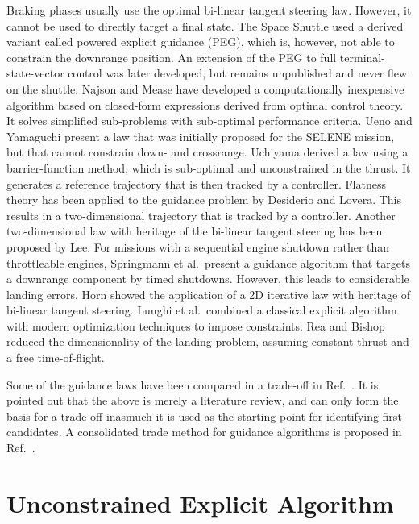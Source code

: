 \documentclass[%
]{aiaa-tc}
\begin{document}
Braking phases usually use the optimal bi-linear tangent steering
law.\cite{Lawden1963} However, it cannot be used to directly target a final
state. The Space Shuttle used a derived variant called powered explicit guidance
(PEG), which is, however, not able to constrain the downrange
position.\cite{McHenry1979} An extension of the PEG to full
terminal-state-vector control was later developed, but remains unpublished and
never flew on the shuttle.\cite{Rea2009,Fill1989} Najson and Mease have developed
a computationally inexpensive algorithm based on closed-form expressions derived
from optimal control theory. It solves simplified sub-problems with sub-optimal
performance criteria.\cite{Najson2006} Ueno and Yamaguchi present a law that was
initially proposed for the SELENE mission, but that cannot constrain down- and
crossrange.\cite{Ueno1999} Uchiyama derived a law using a barrier-function
method, which is sub-optimal and unconstrained in the thrust. It generates a
reference trajectory that is then tracked by a controller.\cite{Uchiyama2007}
Flatness theory has been applied to the guidance problem by Desiderio and
Lovera. This results in a two-dimensional trajectory that is tracked by a
controller.\cite{Desiderio2012} Another two-dimensional law with heritage of the
bi-linear tangent steering has been proposed by Lee.\cite{Lee2011} For missions
with a sequential engine shutdown rather than throttleable engines, Springmann
et al.\ present a guidance algorithm that targets a downrange component by timed
shutdowns. However, this leads to considerable landing
errors.\cite{Springmann2006} Horn showed the application of a 2D iterative law
with heritage of bi-linear tangent steering.\cite{Horn1965,Horn1965a} Lunghi et
al.\ combined a classical explicit algorithm with modern optimization techniques
to impose constraints.\cite{Lunghi2013} Rea and Bishop reduced the
dimensionality of the landing problem, assuming constant thrust and a free
time-of-flight.\cite{Rea2010}

Some of the guidance laws have been compared in a trade-off in
Ref.~. It is pointed out that the above is merely a
literature review, and can only form the basis for a trade-off inasmuch it is
used as the starting point for identifying first candidates. A consolidated trade
method for guidance algorithms is proposed in Ref.~.


\section{Unconstrained Explicit Algorithm}
\end{document}
